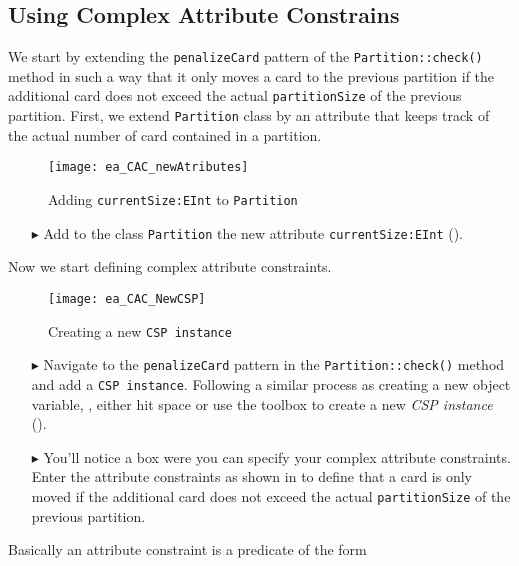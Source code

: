 \subsection{Using Complex Attribute Constrains}     
We start by extending the \texttt{penalizeCard} pattern of the \texttt{Partition::check()} method in such a way that it only moves a card to the previous partition if the additional card does not exceed the actual \texttt{partitionSize} of the previous partition.
First, we extend \texttt{Partition} class by an attribute that keeps track of the actual number of card contained in a partition.
\begin{figure}[htbp]
\begin{center}
  \texttt{[image: ea\_CAC\_newAtributes]}
  \caption{Adding \texttt{currentSize:EInt} to \texttt{Partition}}  
  \label{ea_CAC_newAtributes}
\end{center}
\end{figure}
%
\begin{itemize}    
\item[$\blacktriangleright$] Add to the class \texttt{Partition} the new attribute \texttt{currentSize:EInt} ().
\end{itemize} 
%
Now we start defining complex attribute constraints.
\begin{figure}[htbp]
\begin{center}
  \texttt{[image: ea\_CAC\_NewCSP]}
  \caption{Creating a new \texttt{CSP instance}}  
  \label{ea:CAC_NewCSP}
\end{center}
\end{figure}
\begin{itemize}    
%
\item[$\blacktriangleright$] Navigate to the \texttt{penalizeCard} pattern in the \texttt{Partition::check()} method and add a \texttt{CSP instance}.
Following a similar process as creating a new object variable, \idest, either hit space or use the toolbox to create a new \emph{CSP instance} ().
%
\item[$\blacktriangleright$] You’ll notice a box were you can specify your complex attribute constraints. Enter the attribute constraints as shown in  to define that a card is only moved if the additional card does not exceed the actual \texttt{partitionSize} of the previous partition.
%
\end{itemize}

Basically an attribute constraint is a predicate of the form

